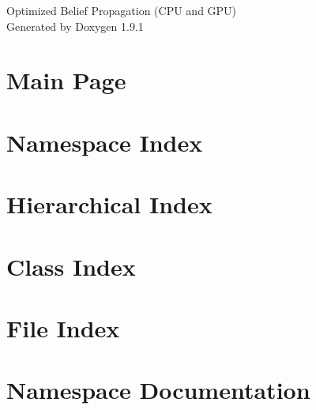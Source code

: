 \let\mypdfximage\pdfximage\def\pdfximage{\immediate\mypdfximage}\documentclass[twoside]{book}
\newcommand{\+}{\discretionary{\mbox{\scriptsize$\hookleftarrow$}}{}{}}
\newcommand{\clearemptydoublepage}{%
  \newpage{\pagestyle{empty}\cleardoublepage}%
}
\begin{document}
\raggedbottom

\hypersetup{pageanchor=false,
             bookmarksnumbered=true,
             pdfencoding=unicode
            }
\begin{titlepage}
\vspace*{7cm}
\begin{center}%
{\Large Optimized Belief Propagation (CPU and GPU) }\\
\vspace*{1cm}
{\large Generated by Doxygen 1.9.1}\\
\end{center}
\end{titlepage}
\clearemptydoublepage
{}
\tableofcontents
\clearemptydoublepage
{}
\hypersetup{pageanchor=true}

\chapter{Main Page}
\label{index}\hypertarget{index}{}
\chapter{Namespace Index}

\chapter{Hierarchical Index}

\chapter{Class Index}

\chapter{File Index}

\chapter{Namespace Documentation}











\end{document}
